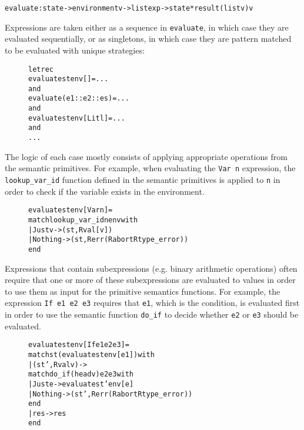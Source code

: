 \begin{alltt}
evaluate:state -> environment v -> list exp -> state * result (list v) v
\end{alltt}

\noindent Expressions are taken either as a sequence in \texttt{evaluate},
in which case they are evaluated sequentially, or as singletons, in which case
they are pattern matched to be evaluated with unique strategies:

\begin{figure}[H]
\begin{alltt}
  let rec
  evaluate st env []      = ...
  and
  evaluate (e1::e2::es)   = ...
  and
  evaluate st env [Lit l] = ...
  and
  ...
\end{alltt}
\end{figure}

\noindent The logic of each case mostly consists of applying appropriate
operations from the semantic primitives. For example, when evaluating
the \texttt{Var n} expression, the \texttt{lookup\_var\_id} function defined
in the semantic primitives is applied to \texttt{n} in order to check if
the variable exists in the environment.

\begin{figure}[H]
\begin{alltt}
  evaluate st env [Var n] =
    match lookup_var_id n env with
    | Just v -> (st, Rval [v])
    | Nothing -> (st, Rerr (Rabort Rtype_error))
    end
\end{alltt}
\end{figure}

\noindent Expressions that contain subexpressions (e.g. binary arithmetic
operations) often require that one or more of these subexpressions are
evaluated to values in order to use them as input for the primitive semantics
functions. For example, the expression \texttt{If e1 e2 e3} requires that
\texttt{e1}, which is the condition, is evaluated first in order to use the
semantic function \texttt{do\_if} to decide whether \texttt{e2} or
\texttt{e3} should be evaluated.

\begin{figure}[H]
\begin{alltt}
  evaluate st env [If e1 e2 e3] =
    match st (evaluate st env [e1]) with
    | (st', Rval v) ->
        match do_if (head v) e2 e3 with
        | Just e -> evaluate st' env [e]
        | Nothing -> (st', Rerr (Rabort Rtype_error))
        end
    | res -> res
    end
\end{alltt}
\end{figure}

